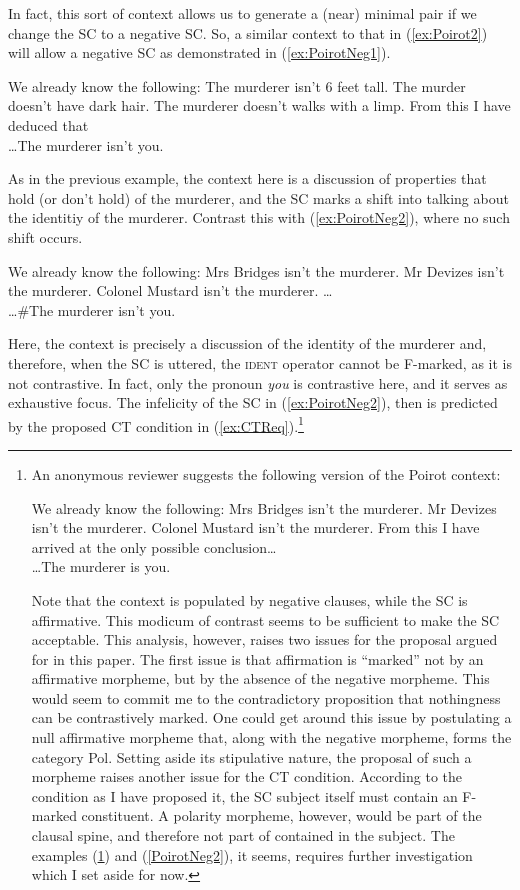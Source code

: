 \documentclass[
]{RCL}
\begin{document}
In fact, this sort of context allows us to generate a (near) minimal pair if we change the SC to a negative SC.
So, a similar context to that in (\ref{ex:Poirot2}) will allow a negative SC as demonstrated in (\ref{ex:PoirotNeg1}).
\begin{exe}
	\ex\label{ex:PoirotNeg1} We already know the following: 
	The murderer isn't 6 feet tall. 
	The murder doesn't have dark hair.
	The murderer doesn't walks with a limp. 
	From this I have deduced that \\
	\ldots The murderer isn't you.
\end{exe}
As in the previous example, the context here is a discussion of properties that hold (or don't hold) of the murderer, and the SC marks a shift into talking about the identitiy of the murderer.
Contrast this with (\ref{ex:PoirotNeg2}), where no such shift occurs.
\begin{exe}
	\ex\label{ex:PoirotNeg2} We already know the following:
	Mrs Bridges isn't the murderer. 
	Mr Devizes isn't the murderer. 
	Colonel Mustard isn't the murderer. \ldots\\
	\ldots \#The murderer isn't you.
\end{exe}
Here, the context is precisely a discussion of the identity of the murderer and, therefore, when the SC is uttered, the \textsc{ident} operator cannot be F-marked, as it is not contrastive.
In fact, only the pronoun \textit{you} is contrastive here, and it serves as exhaustive focus.
The infelicity of the SC in (\ref{ex:PoirotNeg2}), then is predicted by the proposed CT condition in (\ref{ex:CTReq}).\footnote{
An anonymous reviewer suggests the following version of the Poirot context:
\begin{exe}
	\ex\label{ex:PoirotAnon} We already know the following:
	Mrs Bridges isn't the murderer. 
	Mr Devizes isn't the murderer. 
	Colonel Mustard isn't the murderer. 
	From this I have arrived at the only possible conclusion\ldots\\
	\ldots The murderer is you.
\end{exe}
Note that the context is populated by negative clauses, while the SC is affirmative.
This modicum of contrast seems to be sufficient to make the SC acceptable.
This analysis, however, raises two issues for the proposal argued for in this paper.
The first issue is that affirmation is ``marked'' not by an affirmative morpheme, but by the absence of the negative morpheme. 
This would seem to commit me to the contradictory proposition that nothingness can be contrastively marked.
One could get around this issue by postulating a null affirmative morpheme that, along with the negative morpheme, forms the category Pol.
Setting aside its stipulative nature, the proposal of such a morpheme raises another issue for the CT condition.
According to the condition as I have proposed it, the SC subject itself must contain an F-marked constituent.
A polarity morpheme, however, would be part of the clausal spine, and therefore not part of contained in the subject.
The examples (\ref{ex:PoirotAnon}) and (\ref{PoirotNeg2}), it seems, requires further investigation which I set aside for now.
}
\end{document}

